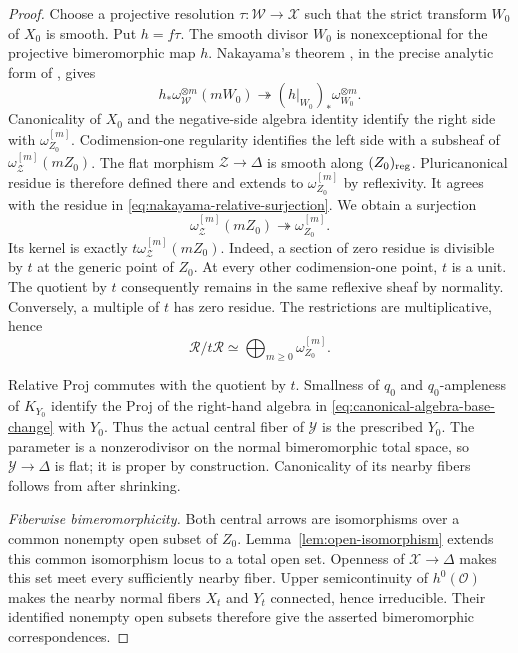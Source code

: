 \documentclass[11pt,a4paper]{article}
\numberwithin{equation}{section}
\theoremstyle{definition}
\theoremstyle{remark}
\newcommand{\OO}{\mathcal O}\newcommand{\cX}{\mathcal X}
\begin{document}
\begin{proof}
Choose a projective
resolution $\tau:\mathcal W\to\mathcal X$ such that the strict
transform $W_0$ of $X_0$ is smooth. Put $h=f\tau$.
The smooth divisor $W_0$ is nonexceptional for the projective
bimeromorphic map $h$. Nakayama's theorem
\cite[VI.3.8]{Nakayama2004}, in the precise analytic form of
\cite[Theorem~9]{Kollar2021}, gives
\begin{equation}\label{eq:nakayama-relative-surjection}
 h_*\omega_{\mathcal W}^{\otimes m}(mW_0)
 \twoheadrightarrow
 (h|_{W_0})_*\omega_{W_0}^{\otimes m}.
\end{equation}
Canonicality of $X_0$ and the negative-side algebra identity identify
the right side with $\omega_{Z_0}^{[m]}$. Codimension-one regularity identifies the left side with a
subsheaf of $\omega_{\mathcal Z}^{[m]}(mZ_0)$. The flat morphism $\mathcal Z\to\Delta$ is smooth along
$(Z_0)_{\mathrm{reg}}$. Pluricanonical residue is therefore defined there and extends to
$\omega_{Z_0}^{[m]}$ by reflexivity. It agrees with the residue in
\eqref{eq:nakayama-relative-surjection}. We obtain a surjection
\[
 \omega_{\mathcal Z}^{[m]}(mZ_0)
 \twoheadrightarrow\omega_{Z_0}^{[m]}.
\]
Its kernel is exactly $t\omega_{\mathcal Z}^{[m]}(mZ_0)$.
Indeed, a section of zero residue is divisible by $t$ at the generic
point of $Z_0$. At every other codimension-one point, $t$ is a unit.
The quotient by $t$ consequently remains in the same reflexive
sheaf by normality. Conversely, a multiple of $t$ has zero residue.
The restrictions are multiplicative, hence
\begin{equation}\label{eq:canonical-algebra-base-change}
 \mathscr R/t\mathscr R
 \simeq\bigoplus_{m\ge0}\omega_{Z_0}^{[m]}.
\end{equation}

Relative Proj commutes with the quotient by $t$. Smallness of
$q_0$ and $q_0$-ampleness of $K_{Y_0}$ identify the Proj of the
right-hand algebra in \eqref{eq:canonical-algebra-base-change}
with $Y_0$. Thus the actual central fiber of $\mathcal Y$ is
the prescribed $Y_0$. The parameter is a nonzerodivisor on the
normal bimeromorphic total space, so $\mathcal Y\to\Delta$ is
flat; it is proper by construction. Canonicality of its nearby
fibers follows from \cite[Lemma~10]{Kollar2021} after shrinking.

\smallskip\noindent\emph{Fiberwise bimeromorphicity.}
Both central arrows are isomorphisms over a common nonempty open
subset of $Z_0$. Lemma~\ref{lem:open-isomorphism}
extends this common isomorphism locus to a total open set.
Openness of $\mathcal X\to\Delta$ makes this set meet every
sufficiently nearby fiber. Upper semicontinuity of $h^0(\OO)$ makes the nearby normal
fibers $X_t$ and $Y_t$ connected, hence irreducible. Their identified nonempty open subsets therefore
give the asserted bimeromorphic correspondences.
\end{proof}
\end{document}
